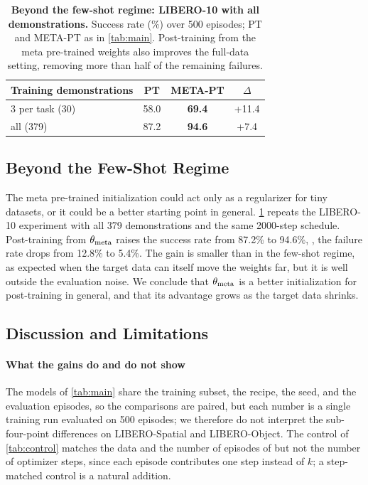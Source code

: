 \begin{table}[t]
  \centering
  \footnotesize
  \setlength{\tabcolsep}{6pt}
  \begin{tabular}{lccc}
    \toprule
    Training demonstrations & PT & META-PT & $\Delta$ \\
    \midrule
    3 per task (30)   & 58.0 & \textbf{69.4} & +11.4 \\
    all (379)         & 87.2 & \textbf{94.6} & +7.4 \\
    \bottomrule
  \end{tabular}
  \caption{\textbf{Beyond the few-shot regime: LIBERO-10 with all demonstrations.}
  Success rate (\%) over 500 episodes; PT and META-PT as in \cref{tab:main}.
  Post-training from the meta pre-trained weights also improves the full-data setting, removing more than half of the remaining failures.}
  \label{tab:fulldata}
\end{table}

\subsection{Beyond the Few-Shot Regime}
\label{sec:exp_full}

The meta pre-trained initialization could act only as a regularizer for tiny datasets, or it could be a better starting point in general.
\cref{tab:fulldata} repeats the LIBERO-10 experiment with all 379 demonstrations and the same 2000-step schedule.
Post-training from $\theta_{\mathrm{meta}}$ raises the success rate from 87.2\% to 94.6\%, \ie, the failure rate drops from 12.8\% to 5.4\%.
The gain is smaller than in the few-shot regime, as expected when the target data can itself move the weights far, but it is well outside the evaluation noise.
We conclude that $\theta_{\mathrm{meta}}$ is a better initialization for post-training in general, and that its advantage grows as the target data shrinks.

\subsection{Discussion and Limitations}
\label{sec:discussion}

\paragraph{What the gains do and do not show}
The models of \cref{tab:main} share the training subset, the recipe, the seed, and the evaluation episodes, so the comparisons are paired, but each number is a single training run evaluated on 500 episodes; we therefore do not interpret the sub-four-point differences on LIBERO-Spatial and LIBERO-Object.
The control of \cref{tab:control} matches the data and the number of episodes of \method but not the number of optimizer steps, since each episode contributes one step instead of $k$; a step-matched control is a natural addition.

